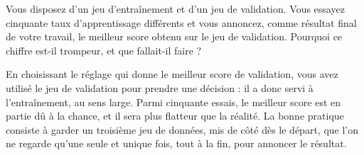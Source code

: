\begin{exercice}
Vous disposez d'un jeu d'entraînement et d'un jeu de validation. Vous
essayez cinquante taux d'apprentissage différents et vous annoncez, comme
résultat final de votre travail, le meilleur score obtenu sur le jeu de
validation. Pourquoi ce chiffre est-il trompeur, et que fallait-il faire ?
\end{exercice}

\begin{solution}
En choisissant le réglage qui donne le meilleur score de validation, vous
avez utilisé le jeu de validation pour prendre une décision : il a donc servi
à l'entraînement, au sens large. Parmi cinquante essais, le meilleur score
est en partie dû à la chance, et il sera plus flatteur que la réalité. La
bonne pratique consiste à garder un troisième jeu de données, mis de côté
dès le départ, que l'on ne regarde qu'une seule et unique fois, tout à la
fin, pour annoncer le résultat.
\end{solution}
